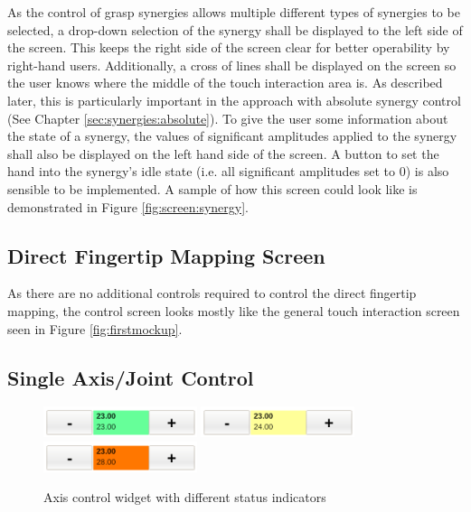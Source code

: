 As the control of grasp synergies allows multiple different types of synergies to be selected, a drop-down selection of the synergy shall be displayed to the left side of the screen. This keeps the right side of the screen clear for better operability by right-hand users. Additionally, a cross of lines shall be displayed on the screen so the user knows where the middle of the touch interaction area is. As described later, this is particularly important in the approach with absolute synergy control (See Chapter \ref{sec:synergies:absolute}). To give the user some information about the state of a synergy, the values of significant amplitudes applied to the synergy shall also be displayed on the left hand side of the screen. A button to set the hand into the synergy's idle state (i.e. all significant amplitudes set to $0$) is also sensible to be implemented. A sample of how this screen could look like is demonstrated in Figure \ref{fig:screen:synergy}.

\subsection{Direct Fingertip Mapping Screen}

As there are no additional controls required to control the direct fingertip mapping, the control screen looks mostly like the general touch interaction screen seen in Figure \ref{fig:firstmockup}.

\subsection{Single Axis/Joint Control}

\begin{figure}
	\caption{\label{fig:axiscontrol}Axis control widget with different status indicators}
	\includegraphics[width=0.4\textwidth]{assets/chpt_concepts/AxisControlGreen}
	\includegraphics[width=0.4\textwidth]{assets/chpt_concepts/AxisControlYellow}
	\includegraphics[width=0.4\textwidth]{assets/chpt_concepts/AxisControlRed}
\end{figure}

